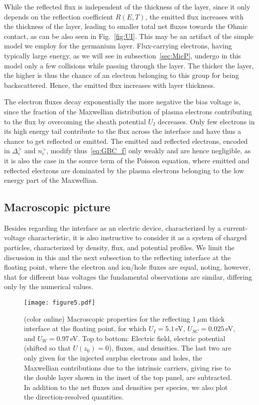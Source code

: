 \documentclass[pre,reprint,floats]{revtex4-1}
\begin{document}
While the reflected flux is independent of the thickness of the layer, since it only depends on the reflection 
coefficient $R(E,T)$, the emitted flux increases with the thickness of the layer, leading to smaller total 
net fluxes towards the Ohmic contact, as can be also seen in Fig.~\ref{fig:UI}. This may be an artifact of 
the simple model we employ for the germanium layer. Flux-carrying electrons, having typically large energy,
as we will see in subsection~\ref{sec:MicP}, undergo in this model only a few collisions while passing through 
the layer. The thicker the layer, the higher is thus the chance of an electron belonging to this group for 
being backscattered. Hence, the emitted flux increases with layer thickness.  

The electron fluxes decay exponentially the more negative the bias voltage is, since the fraction 
of the Maxwellian distribution of plasma electrons contributing to the flux by overcoming the sheath 
potential $U_I$ decreases. Only few electrons in its high energy tail contribute to the flux across 
the interface and have thus a chance to get reflected or emitted. The emitted and reflected 
electrons, encoded in $\Delta_e^>$ and $n_e^>$, modify thus~\eqref{eq:GBC_f} only weakly and are 
hence negligible, as it is also the case in the source term of the Poisson equation, where emitted
and reflected electrons are dominated by the plasma electrons belonging to the low energy part of 
the Maxwellian. 


\subsection{Macroscopic picture}\label{sec:MacP}

Besides regarding the interface as an electric device, characterized by a current-voltage characteristic,
it is also instructive to consider it as a system of charged particles, characterized by density, flux, and 
potential profiles. We limit the discussion in this and the next subsection to the reflecting interface 
at the floating point, where the electron and ion/hole fluxes are equal, noting, however, that 
for different bias voltages the fundamental observations are similar, differing only by the numerical values.

\begin{figure}[t]
\texttt{[image: figure5.pdf]}
\caption{(color online) Macroscopic properties for the reflecting $1\,\mu\mbox{m}$ thick interface
at the floating point, for which $U_I=5.1\,$eV, $U_{SC}=0.025\,$eV, and $U_W=0.97\,$eV.
Top to bottom: Electric field, electric potential (shifted so that 
$U(z_0)=0$), fluxes, and densities. The last two are only given for the injected surplus electrons 
and holes, the Maxwellian contributions due to the intrinsic carriers, giving rise to the double layer 
shown in the inset of the top panel, are subtracted. In addition to the net fluxes and densities per
species, we also plot the direction-resolved quantities.}  
\label{fig:macroscopic_plots}
\end{figure}
\end{document}
